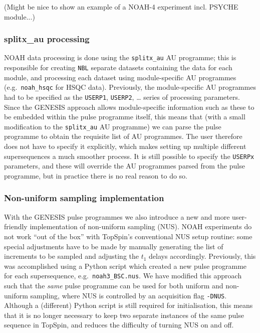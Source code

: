 \documentclass[a4paper,11pt]{article}
\newcommand{\carbon}{\ce{^{13}C}}
\newcommand{\todo}[1]{\textcolor{WildStrawberry}{#1}}
\begin{document}
\todo{(Might be nice to show an example of a NOAH-4 experiment incl. PSYCHE module...)}

\subsubsection{splitx\_au processing}

NOAH data processing is done using the \texttt{splitx\_au} AU programme; this is responsible for creating \texttt{NBL} separate datasets containing the data for each module, and processing each dataset using module-specific AU programmes (e.g.\ \texttt{noah\_hsqc} for \carbon{} HSQC data).
Previously, the module-specific AU programmes had to be specified as the \texttt{USERP1}, \texttt{USERP2}, \ldots{} series of processing parameters.
Since the GENESIS approach allows module-specific information such as these to be embedded within the pulse programme itself, this means that (with a small modification to the \texttt{splitx\_au} AU programme) we can parse the pulse programme to obtain the requisite list of AU programmes.
The user therefore does not have to specify it explicitly, which makes setting up multiple different supersequences a much smoother process.
It is still possible to specify the \texttt{USERPx} parameters, and these will override the AU programmes parsed from the pulse programme, but in practice there is no real reason to do so.

\subsubsection{Non-uniform sampling implementation}

With the GENESIS pulse programmes we also introduce a new and more user-friendly implementation of non-uniform sampling (NUS).
NOAH experiments do not work ``out of the box'' with TopSpin's conventional NUS setup routine: some special adjustments have to be made by manually generating the list of increments to be sampled and adjusting the $t_1$ delays accordingly.
Previously, this was accomplished using a Python script which created a new pulse programme for each supersequence, e.g.\ \texttt{noah3\_BSC.nus}.\autocite{Claridge2019MRC}
We have modified this approach such that the \textit{same} pulse programme can be used for both uniform and non-uniform sampling, where NUS is controlled by an acquisition flag \texttt{-DNUS}.
Although a (different) Python script is still required for initialisation, this means that it is no longer necessary to keep two separate instances of the same pulse sequence in TopSpin, and reduces the difficulty of turning NUS on and off.
\end{document}

